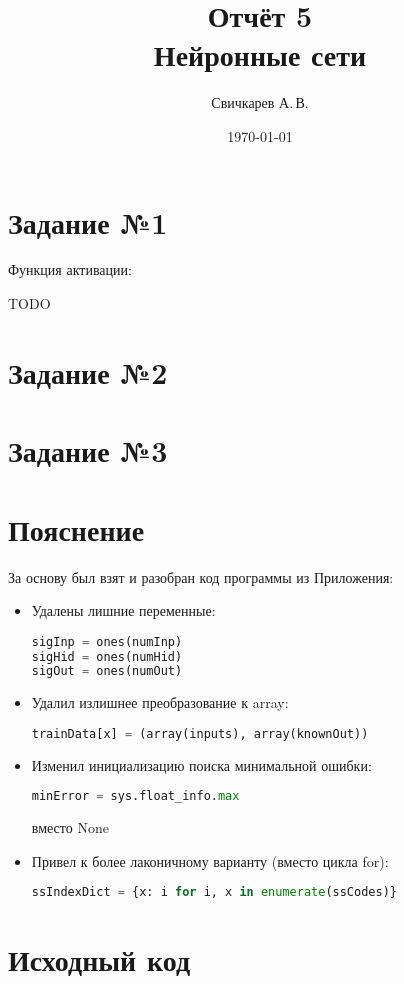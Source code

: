 \documentclass{article} %
\title{Отчёт 5\protect\\Нейронные сети} %
\author{Свичкарев А.\,В.} %
\date{\today} %
\begin{document}

\maketitle %

\section{Задание №1}
Функция активации:

TODO

\section{Задание №2}

\section{Задание №3}

\section{Пояснение}
За основу был взят и разобран код программы из Приложения:
\begin{itemize}
	\item Удалены лишние переменные:
		\begin{lstlisting}[language=Python]
sigInp = ones(numInp)
sigHid = ones(numHid)
sigOut = ones(numOut)
		\end{lstlisting}
	\item Удалил излишнее преобразование к array:
		\begin{lstlisting}[language=Python]
trainData[x] = (array(inputs), array(knownOut))
		\end{lstlisting}
	\item Изменил инициализацию поиска минимальной ошибки:
		\begin{lstlisting}[language=Python]
minError = sys.float_info.max
		\end{lstlisting}
вместо None
	\item Привел к более лаконичному варианту (вместо цикла for):
		\begin{lstlisting}[language=Python]
ssIndexDict = {x: i for i, x in enumerate(ssCodes)}
		\end{lstlisting}
\end{itemize}

\section{Исходный код}
% 
\end{document}
